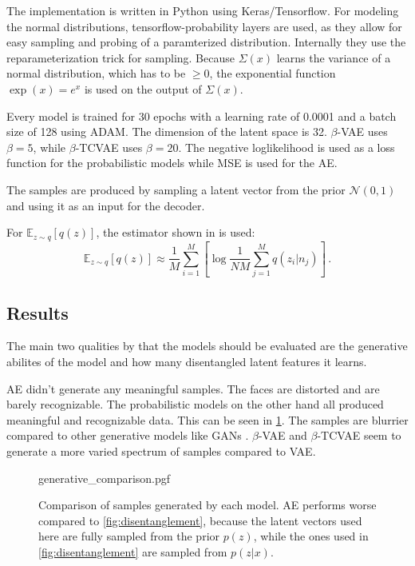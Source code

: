 \documentclass[a4paper]{IEEEtran}
\begin{document}
{The implementation is written in Python using Keras/Tensorflow. For modeling the normal distributions, tensorflow-probability layers are used, as they allow for easy sampling and probing of a paramterized distribution. Internally they use the reparameterization trick for sampling. Because $\Sigma(x)$ learns the variance of a normal distribution, which has to be $\geq 0$, the exponential function $\exp(x) = e^x$ is used on the output of $\Sigma(x)$.

Every model is trained for 30 epochs with a learning rate of 0.0001 and a batch size of 128 using ADAM\cite{DBLP:journals/corr/KingmaB14}. The dimension of the latent space is 32. $\beta$-VAE uses $\beta = 5$, while $\beta$-TCVAE uses $\beta = 20$. The negative loglikelihood is used as a loss function for the probabilistic models while MSE is used for the AE.

The samples are produced by sampling a latent vector from the prior $\mathcal{N}(0,1)$ and using it as an input for the decoder.

For $\mathbb{E}_{z \sim q}\left[ q(z) \right]$, the estimator shown in \cite{chen2019isolating} is used:
\begin{equation}
	\mathbb{E}_{z \sim q} \left[ q(z) \right] \approx \frac{1}{M} \sum_{i = 1}^{M} \left[ \log \frac{1}{NM} \sum_{j = 1}^{M}q(z_i|n_j) \right]\,.
\end{equation}

\subsection{Results}
The main two qualities by that the models should be evaluated are the generative abilites of the model and how many disentangled latent features it learns.

AE didn't generate any meaningful samples. The faces are distorted and are barely recognizable. The probabilistic models on the other hand all produced meaningful and recognizable data. This can be seen in \ref{fig:generative}. The samples are blurrier compared to other generative models like GANs \cite{goodfellow2014generative}. $\beta$-VAE and $\beta$-TCVAE seem to generate a more varied spectrum of samples compared to VAE.

\begin{figure}
	\centering
    {generative_comparison.pgf}
    \caption{Comparison of samples generated by each model. AE performs worse compared to \ref{fig:disentanglement}, because the latent vectors used here are fully sampled from the prior $p(z)$, while the ones used in \ref{fig:disentanglement} are sampled from $p(z|x)$.}
    \label{fig:generative}
\end{figure}

}
\end{document}
